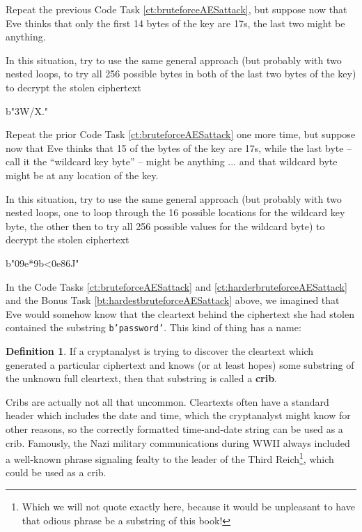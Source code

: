 \documentclass[12pt,letterpaper]{amsbook}
\theoremstyle{definition}
\newtheorem{definition}[theorem]{Definition}
\theoremstyle{remark}
\numberwithin{figure}{section}
\numberwithin{exercise}{chapter}
\numberwithin{section}{chapter}
\numberwithin{equation}{section}
\numberwithin{table}{subsection}
\newcommand{\code}[1]{\colorbox{lg}{\texttt{#1}}}
\newcommand{\ix}[1]{{#1}\index{#1}}
\begin{document}
\vskip2mm
\begin{CTtcb}[label=ct:harderbruteforceAESattack]{}{}
Repeat the previous Code Task \ref{ct:bruteforceAESattack}, but suppose now
that Eve thinks that only the first 14 bytes of the key are 17s, the last two
might be anything.

In this situation, try to use the same general approach (but probably with two
nested loops, to try all 256 possible bytes in both of the last two bytes of
the key) to decrypt the stolen ciphertext\\
\begin{codedisp}
b"\xb3W/X.\xda{}\xed\xde\xedT\xfe"
\end{codedisp}
\end{CTtcb}

\begin{BTtcb}[label=bt:hardestbruteforceAESattack]{}{}
Repeat the prior Code Task \ref{ct:bruteforceAESattack} one more time, but
suppose now that Eve thinks that 15 of the bytes of the key are 17s, while the
last byte -- call it the ``wildcard key byte'' -- might be anything ... and that
wildcard byte might be at any location of the key.

In this situation, try to use the same general approach (but probably with two
nested loops, one to loop through the 16 possible locations for the wildcard key
byte, the other then to try all 256 possible values for the wildcard byte) to
decrypt the stolen ciphertext\\
\begin{codedisp}
b"0\xbd\x9e*\x9b<\xfa\x0e\x86J\xfd@"
\end{codedisp}
\end{BTtcb}

In the Code Tasks \ref{ct:bruteforceAESattack} and \ref{ct:harderbruteforceAESattack} and the Bonus Task \ref{bt:hardestbruteforceAESattack} above, we imagined
that Eve would somehow know that the cleartext behind the ciphertext she had
stolen contained the substring \code{b'password'}.  This kind of thing has a name:
\begin{definition}\label{def:crib}
If a cryptanalyst is trying to discover the cleartext which generated a particular
ciphertext and knows (or at least hopes) some substring of the unknown full
cleartext, then that substring is called a \textbf{\ix{crib}}.
\end{definition}
Cribs are actually not all that uncommon.  Cleartexts often have a standard
header which includes the date and time, which the cryptanalyst might know
for other reasons, so the correctly formatted time-and-date string can be used
as a crib.  Famously, the Nazi military communications during WWII always
included a well-known phrase signaling fealty to the leader of the Third
Reich\footnote{Which we will not quote exactly here, because it would be
unpleasant to have that odious phrase be a substring of this book!}, which
could be used as a crib.
\end{document}
